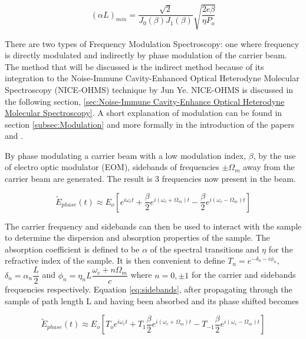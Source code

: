\documentclass[11pt,a4paper]{book}
\begin{document}
		\begin{equation}
			\label{eq:FMSlimit}
			(\alpha L)_{min}=\dfrac{\sqrt{2}}{J_0(\beta)J_1(\beta)}\sqrt{\dfrac{2e\beta}{\eta P_o}}
		\end{equation}
		
		There are two types of Frequency Modulation Spectroscopy: one where frequency is directly modulated and indirectly by phase modulation of the carrier beam. The method that will be discussed is the indirect method because of its integration to the Noise-Immune Cavity-Enhanced Optical Heterodyne Molecular Spectroscopy (NICE-OHMS) technique by Jun Ye. NICE-OHMS is discussed in the following section, \autoref{sec:Noise-Immune Cavity-Enhance Optical Heterodyne Molecular Spectroscopy}.  A short explanation of modulation can be found in section \autoref{subsec:Modulation} and more formally in the introduction of the papers \cite{PDH Intro} and \cite{FMspec}.
		
		By phase modulating a carrier beam with a low modulation index, $\beta$, by the use of electro optic modulator (EOM), sidebands of frequencies $\pm \Omega_m $ away from the carrier beam are generated. The result is 3 frequencies now present in the beam.
		
		\begin{equation}
			\label{eq:sidebands}
			\tilde{E}_{phase}(t)\approx E_o [e^{i\omega_c t}   +   \dfrac{\beta}{2} e^{i(\omega_c +\Omega_m)t}  -  \dfrac{\beta}{2} e^{i(\omega_c -\Omega_m)t}]
		\end{equation}	
		
		The carrier frequency and sidebands can then be used to interact with the sample to determine the dispersion and absorption properties of the sample. The absorption coefficient is defined to be $\alpha$ of the spectral transitions and $\eta$ for the refractive index of the sample. It is then convenient to define $T_n=e^{-\delta_n -i \phi_n}$, $\delta_n=\alpha_n \dfrac{L}{2}$ and $\phi_n=\eta_n L\dfrac{\omega_c + n\Omega_m}{c}$ where $n=0,\pm1$ for the carrier and sidebands frequencies respectively. Equation \autoref{eq:sidebands}, after propagating through the sample of path length L and having been absorbed and its phase shifted becomes
		
		\begin{equation}
			\tilde{E}_{phase}(t)\approx E_o [T_o e^{i\omega_c t}   +   T_1 \dfrac{\beta}{2} e^{i(\omega_c +\Omega_m)t}  -  T_{-1} \dfrac{\beta}{2} e^{i(\omega_c -\Omega_m)t}]
		\end{equation}
		
\end{document}
